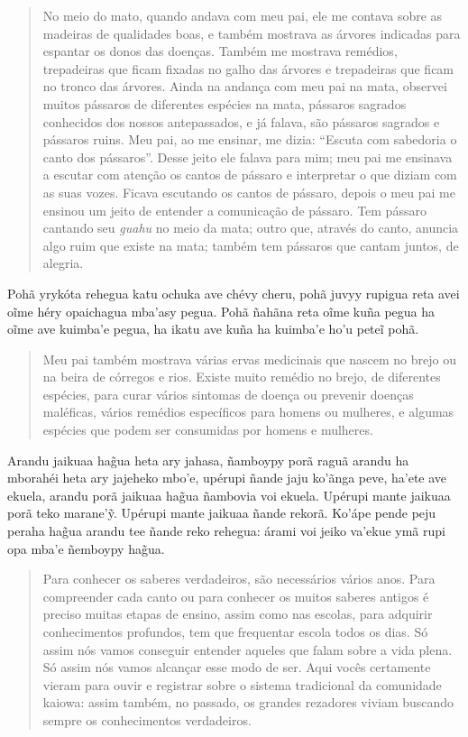 \begin{quote}
No meio do mato, quando andava com meu pai, ele me contava sobre as
madeiras de qualidades boas, e também mostrava as árvores indicadas para
espantar os donos das doenças. Também me mostrava remédios, trepadeiras
que ficam fixadas no galho das árvores e trepadeiras que ficam no tronco
das árvores. Ainda na andança com meu pai na mata, observei muitos
pássaros de diferentes espécies na mata, pássaros sagrados conhecidos
dos nossos antepassados, e já falava, são pássaros sagrados e pássaros
ruins. Meu pai, ao me ensinar, me dizia: ``Escuta com sabedoria o canto
dos pássaros''. Desse jeito ele falava para mim; meu pai me ensinava a
escutar com atenção os cantos de pássaro e interpretar o que diziam com
as suas vozes. Ficava escutando os cantos de pássaro, depois o meu pai
me ensinou um jeito de entender a comunicação de pássaro. Tem pássaro
cantando seu \emph{guahu} no meio da mata; outro que, através do canto,
anuncia algo ruim que existe na mata; também tem pássaros que cantam
juntos, de alegria.
\end{quote}

Pohã yrykóta rehegua katu ochuka ave chévy cheru, pohã juvyy rupigua
reta avei oĩme héry opaichagua mba'asy pegua. Pohã ñahãna reta oĩme kuña
pegua ha oĩme ave kuimba'e pegua, ha ikatu ave kuña ha kuimba'e ho'u
peteĩ pohã.

\begin{quote}
Meu pai também mostrava várias ervas medicinais que nascem no brejo ou
na beira de córregos e rios. Existe muito remédio no brejo, de
diferentes espécies, para curar vários sintomas de doença ou prevenir
doenças maléficas, vários remédios específicos para homens ou mulheres,
e algumas espécies que podem ser consumidas por homens e mulheres.
\end{quote}

Arandu jaikuaa hag̃ua heta ary jahasa, ñamboypy porã raguã arandu ha
mborahéi heta ary jajeheko mbo'e, upérupi ñande jaju ko'ãnga peve,
ha'ete ave ekuela, arandu porã jaikuaa hag̃ua ñambovia voi ekuela.
Upérupi mante jaikuaa porã teko marane'ỹ. Upérupi mante jaikuaa ñande
rekorã. Ko'ápe pende peju peraha hag̃ua arandu tee ñande reko rehegua:
árami voi jeiko va'ekue ymã rupi opa mba'e ñemboypy hag̃ua.

\begin{quote}
Para conhecer os saberes verdadeiros, são necessários vários anos. Para
compreender cada canto ou para conhecer os muitos saberes antigos é
preciso muitas etapas de ensino, assim como nas escolas, para adquirir
conhecimentos profundos, tem que frequentar escola todos os dias. Só
assim nós vamos conseguir entender aqueles que falam sobre a vida plena.
Só assim nós vamos alcançar esse modo de ser. Aqui vocês certamente
vieram para ouvir e registrar sobre o sistema tradicional da comunidade
kaiowa: assim também, no passado, os grandes rezadores viviam buscando
sempre os conhecimentos verdadeiros.
\end{quote}

